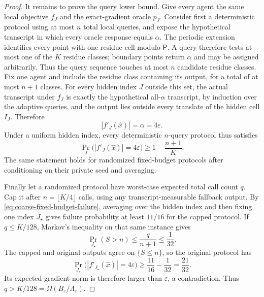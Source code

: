 \documentclass[11pt,a4paper]{article}
\newcommand{\eps}{\varepsilon}
\theoremstyle{remark}
\begin{document}
\begin{proof}
It remains to prove the query lower bound.  Give every agent the same local
objective $f_J$ and the exact-gradient oracle $p_J$.  Consider first a
deterministic protocol using at most $n$ total local queries, and expose the
hypothetical transcript in which every oracle response equals $\alpha$.
The periodic extension identifies every point with one residue cell modulo
$\mathsf P$.  A query therefore tests at most one of the $K$ residue classes;
boundary points return $\alpha$ and may be assigned arbitrarily.  Thus the
query sequence touches at most $n$ candidate residue classes.  Fix one agent
and include the residue class containing its output, for a total of at most
$n+1$ classes.  For every hidden index $J$ outside this set, the actual
transcript under $f_J$ is exactly the hypothetical all-$\alpha$ transcript,
by induction over the adaptive queries, and the output lies outside every
translate of the hidden cell $I_J$.
Therefore
\begin{equation}
 |f'_J(\widehat x)|=\alpha=4\eps.
 \label{eq:coarse-unqueried-output}
\end{equation}
Under a uniform hidden index, every deterministic $n$-query protocol thus
satisfies
\begin{equation}
 \Pr_J\bigl(|f'_J(\widehat x)|=4\eps\bigr)
 \ge1-\frac{n+1}{K}.
 \label{eq:coarse-fixed-budget-failure}
\end{equation}
The same statement holds for randomized fixed-budget protocols after
conditioning on their private seed and averaging.

Finally let a randomized protocol have worst-case expected total call count
$q$.  Cap it after $n=\lfloor K/4\rfloor$ calls, using any
transcript-measurable fallback output.  By
\eqref{eq:coarse-fixed-budget-failure}, averaging over the hidden index and
then fixing one index $J_\star$ gives failure probability at least $11/16$
for the capped protocol.  If $q\le K/128$, Markov's inequality on that same
instance gives
\[
 \Pr_{J_\star}(S>n)
 \le\frac{q}{n+1}\le\frac1{32}.
\]
The capped and original outputs agree on $\{S\le n\}$, so the original
protocol has
\[
 \Pr_{J_\star}\bigl(|f'_{J_\star}(\widehat x)|=4\eps\bigr)
 \ge\frac{11}{16}-\frac1{32}
 =\frac{21}{32}.
\]
Its expected gradient norm is therefore larger than $\eps$, a contradiction.
Thus $q>K/128=\Omega(B_\eps/\Lambda_\eps)$.
\end{proof}
\end{document}
